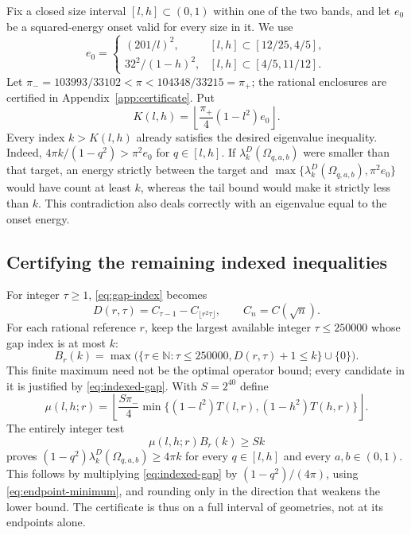 \documentclass[11pt,reqno]{amsart}
\numberwithin{equation}{section}
\newcommand{\N}{\mathbb N}
\newcommand{\Om}{\Omega}
\begin{document}
Fix a closed size interval $[l,h]\subset(0,1)$ within one
of the two bands, and let $e_0$ be a squared-energy onset
valid for every size in it. We use
\begin{equation}\label{eq:energy-onsets}
 e_0=
 \begin{cases}
 (201/l)^2,&[l,h]\subset[12/25,4/5],\\
 32^2/(1-h)^2,&[l,h]\subset[4/5,11/12].
 \end{cases}
\end{equation}
Let $\pi_-=103993/33102<\pi<104348/33215=\pi_+$;
the rational enclosures are certified in
Appendix~\ref{app:certificate}. Put
\begin{equation}\label{eq:finite-index-cutoff}
 K(l,h)=\left\lfloor\frac{\pi_+}{4}(1-l^2)e_0\right\rfloor.
\end{equation}
Every index $k>K(l,h)$ already satisfies the desired
eigenvalue inequality. Indeed,
$4\pi k/(1-q^2)>\pi^2e_0$ for $q\in[l,h]$.
If $\lambda_k^D(\Om_{q,a,b})$ were smaller than that target,
an energy strictly between the target and
$\max\{\lambda_k^D(\Om_{q,a,b}),\pi^2e_0\}$ would have
count at least $k$, whereas the tail bound would make it
strictly less than $k$. This contradiction also deals
correctly with an eigenvalue equal to the onset energy.

\subsection*{Certifying the remaining indexed inequalities}

For integer $\tau\ge1$, \eqref{eq:gap-index} becomes
\[
 D(r,\tau)=C_{\tau-1}-C_{\lfloor r^2\tau\rfloor},
 \qquad C_n=C(\sqrt n).
\]
For each rational reference $r$, keep the largest available
integer $\tau\le250000$ whose gap index is at most $k$:
\begin{equation}\label{eq:gap-frontier}
 B_r(k)=\max\bigl(\{\tau\in\N:\tau\le250000,
                     D(r,\tau)+1\le k\}\cup\{0\}\bigr).
\end{equation}
This finite maximum need not be the optimal operator bound;
every candidate in it is justified by
\eqref{eq:indexed-gap}. With $S=2^{40}$ define
\begin{equation}\label{eq:integer-coefficient}
 \mu(l,h;r)=\left\lfloor
 \frac{S\pi_-}{4}
 \min\{(1-l^2)T(l,r),(1-h^2)T(h,r)\}\right\rfloor.
\end{equation}
The entirely integer test
\begin{equation}\label{eq:integer-acceptance}
 \mu(l,h;r)B_r(k)\ge Sk
\end{equation}
proves $(1-q^2)\lambda_k^D(\Om_{q,a,b})\ge4\pi k$
for every $q\in[l,h]$ and every $a,b\in(0,1)$.
This follows by multiplying \eqref{eq:indexed-gap} by
$(1-q^2)/(4\pi)$, using \eqref{eq:endpoint-minimum},
and rounding only in the direction that weakens the lower
bound. The certificate is thus on a full interval of
geometries, not at its endpoints alone.
\end{document}
